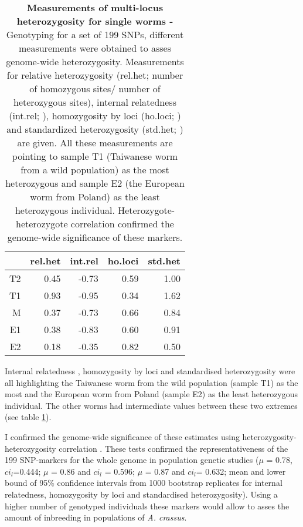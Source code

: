 \begin{table}[ht]
\begin{center}
\begin{tabular}{rrrrr}
  \hline
 & rel.het & int.rel & ho.loci & std.het \\ 
  \hline
T2 & 0.45 & -0.73 & 0.59 & 1.00 \\ 
  T1 & 0.93 & -0.95 & 0.34 & 1.62 \\ 
  M & 0.37 & -0.73 & 0.66 & 0.84 \\ 
  E1 & 0.38 & -0.83 & 0.60 & 0.91 \\ 
  E2 & 0.18 & -0.35 & 0.82 & 0.50 \\ 
   \hline
\end{tabular}
\caption[Measurements of multi-locus heterozygosity for single
worms]{\textbf{Measurements of multi-locus heterozygosity for single
    worms -} Genotyping for a set of 199 SNPs, different measurements
  were obtained to asses genome-wide heterozygosity.  Measurements for
  relative heterozygosity (rel.het; number of homozygous sites/ number
  of heterozygous sites), internal relatedness (int.rel;
  \cite{pmid11571049}), homozygosity by loci (ho.loci;
  \cite{pmid17107491}) and standardized heterozygosity (std.het;
  \cite{coltman81j}) are given.  All these measurements are pointing
  to sample T1 (Taiwanese worm from a wild population) as the most
  heterozygous and sample E2 (the European worm from Poland) as the
  least heterozygous individual. Heterozygote-heterozygote correlation
  \cite{pmid21565077} confirmed the genome-wide significance of these
  markers.}
\label{snp-sing}
\end{center}
\end{table}

Internal relatedness \cite{pmid11571049}, homozygosity by loci
\cite{pmid17107491} and standardised heterozygosity \cite{coltman81j}
were all highlighting the Taiwanese worm from the wild population
(sample T1) as the most and the European worm from Poland (sample E2)
as the least heterozygous individual. The other worms had intermediate
values between these two extremes (see table \ref{snp-sing}).

I confirmed the genome-wide significance of these estimates using
heterozygosity-heterozygosity correlation \cite{pmid21565077}. These
tests confirmed the representativeness of the 199 SNP-markers for the
whole genome in population genetic studies ($\mu$ = 0.78,
$ci_l$=0.444; $\mu$ = 0.86 and $ci_l$ = 0.596; $\mu$ = 0.87 and
$ci_l$= 0.632; mean and lower bound of 95\% confidence intervals from
1000 bootstrap replicates for internal relatedness, homozygosity by
loci and standardised heterozygosity). Using a higher number of
genotyped individuals these markers would allow to asses the amount of
inbreeding in populations of \textit{A. crassus}.


